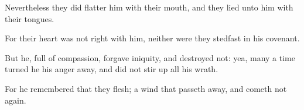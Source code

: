 {\par }{\Q {}Nevertheless they did
flatter him with their
mouth, and they
lied unto him with their
tongues.


\par }{\Q {}For their
heart was not
right with him, neither were they
stedfast in his
covenant.


\par }{\Q {}But he,
{} full of
compassion,
forgave
{}
iniquity, and
destroyed
{} not: yea, many a
time
turned he his
anger
away, and did not stir
up all his
wrath.


\par }{\Q {}For he
remembered that they
{}
flesh; a
wind that passeth
away, and cometh not
again.


\par }{\BB \par }
